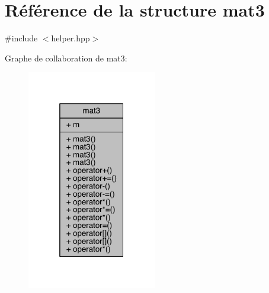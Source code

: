 \hypertarget{structmat3}{\section{Référence de la structure mat3}
\label{structmat3}
}


{\ttfamily \#include $<$helper.\+hpp$>$}



Graphe de collaboration de mat3\+:
\nopagebreak
\begin{figure}[H]
\begin{center}
\leavevmode
\includegraphics[width=160pt]{structmat3__coll__graph}
\end{center}
\end{figure}
